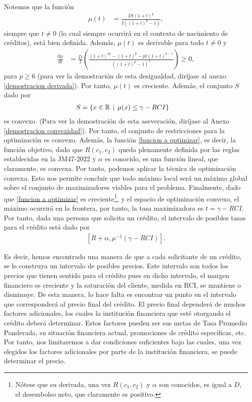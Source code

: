 Notemos que la función
\begin{align}\label{mu}
    \mu(t) &= \frac{Dt(1+t)^p}{I((1+t)^p-1)},
\end{align}
siempre que $t\neq 0$ (lo cual siempre ocurrirá en el contexto de nacimiento de créditos), está bien definida. Además, $\mu(t)$ es derivable para todo $t\neq 0$ y 
\begin{align*}
    \frac{d\mu}{dt} &= \frac{D}{I}\left( \frac{(1+t)^{2p} - (1+t)^p-pt(1+t)^{p-1}}{((1+t)^p-1)^2} \right) \geq 0,
\end{align*}
para $p\geq 6$ (para ver la demostración de esta desigualdad, diríjase al anexo \ref{demostracion derivada}). Por tanto, $\mu(t)$ es creciente. Además, el conjunto $S$ dado por
\begin{align*}
    S &= \left\lbrace x \in \mathbb{R} \hspace{0.15cm} | \hspace{0.15cm} \mu(x) \leq \gamma - RCI \right\rbrace
\end{align*}
es convexo. (Para ver la demostración de esta aseveración, diríjase al Anexo \ref{demostracion convexidad}). Por tanto, el conjunto de restricciones para la optimización es convexo. Además, la función \ref{funcion a optimizar}, es decir, la función objetivo, dado que $R(c_1,c_2)$ queda plenamente definida por las reglas establecidas en la JM47-2022 y $\alpha$ es conocido, es una función lineal, que claramente, es convexa. Por tanto, podemos aplicar la técnica de optimización convexa. Esto nos permite concluir que todo máximo local será un máximo global sobre el conjunto de maximizadores viables para el problema. Finalmente, dado que \ref{funcion a optimizar} es creciente\footnote{Nótese que su derivada, una vez $R(c_1,c_2)$ y $\alpha$ son conocidos, es igual a $D$, el desembolso neto, que claramente es positivo.}, y el espacio de optimización convexo, el máximo ocurrirá en la frontera, por tanto, la tasa maximizadora es $t = \gamma - RCI$. Por tanto, dada una persona que solicita un crédito, el intervalo de posibles tasas para el crédito está dado por
\begin{align*}
    \left[ R +\alpha, \mu^{-1}(\gamma - RCI) \right].
\end{align*}

Es decir, hemos encontrado una manera de que a cada solicitante de un crédito, se le construya un intervalo de posibles precios. Este intervalo son todos los precios que tienen sentido para el crédito pues en dicho intervalo, el margen financiero es creciente y la saturación del cliente, medida en RCI, se mantiene o disminuye. De esta manera, lo hace falta es encontrar un punto en el intervalo que corresponderá al precio final del crédito. El precio final dependerá de muchos factores adicionales, los cuales la institución financiera que esté otorgando el crédito deberá determinar. Estos factores pueden ser sus metas de Tasa Promedio Ponderada, su situación financiera actual, promociones de crédito específicas, etc. Por tanto, nos limitaremos a dar condiciones suficientes bajo las cuales, una vez elegidos los factores adicionales por parte de la institución financiera, se puede determinar el precio. 

